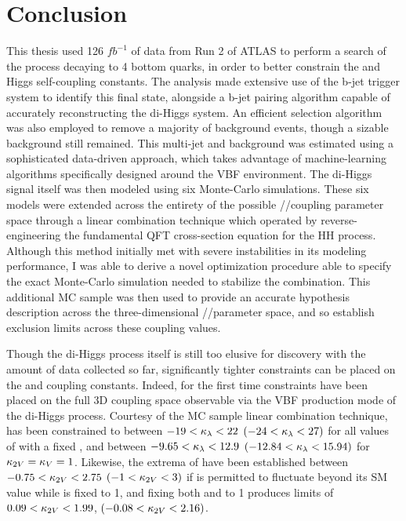 \chapter{Conclusion}\label{chapter:conclusion}

This thesis used 126 $\textit{fb}^{-1}$ of data from Run 2 of ATLAS
    to perform a search of the \hhproc process decaying to 4 bottom quarks,
    in order to better constrain the \kl and \kvv Higgs self-coupling constants.
The analysis made extensive use of the b-jet trigger system to identify this final state,
    alongside a b-jet pairing algorithm capable of accurately reconstructing the di-Higgs system.
An efficient selection algorithm was also employed to remove a majority of background events,
    though a sizable background still remained.
This multi-jet and \ttbar background was estimated using a sophisticated data-driven approach,
    which takes advantage of machine-learning algorithms specifically designed around the VBF environment.
The di-Higgs signal itself was then modeled using six Monte-Carlo simulations.
These six models were extended across the entirety of the possible \kvv/\kl/\kvv coupling parameter space
    through a linear combination technique
    which operated by reverse-engineering the fundamental QFT cross-section equation for the HH process.
Although this method initially met with severe instabilities in its modeling performance,
    I was able to derive a novel optimization procedure able to specify
    the exact Monte-Carlo simulation needed to stabilize the combination.
This additional MC sample was then used to provide an accurate hypothesis description across
    the three-dimensional \kvv/\kl/\kv parameter space,
    and so establish exclusion limits across these coupling values. 

Though the di-Higgs process itself is still too elusive for discovery with the amount of data collected so far,
    significantly tighter constraints can be placed on the \kvv and \kl coupling constants.
Indeed, for the first time constraints have been placed on the full
    3D coupling space observable via the VBF production mode of the di-Higgs process.
Courtesy of the MC sample linear combination technique,
    \kl has been constrained to between $ -19 < \kappa_{\lambda} < 22$ $( -24 < \kappa_{\lambda} < 27)$ for all values of \kvv with a fixed ,
    and between $-9.65 < \kappa_{\lambda} < 12.9$ $(-12.84 < \kappa_{\lambda} < 15.94)$ for $\kappa_{2V}=\kappa_{V}=1$.
Likewise, the extrema of \kvv have been established between $-0.75 < \kappa_{2V} < 2.75$ $(-1 < \kappa_{2V} < 3)$
    if \kl is permitted to fluctuate beyond its SM value while \kv is fixed to 1,
    and fixing both \kl and \kv to 1 produces limits of $0.09 < \kappa_{2V} < 1.99$, $(-0.08 < \kappa_{2V} < 2.16)$.

